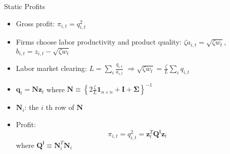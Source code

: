 \documentclass[
  10pt,               %
  aspectratio=169,     %
]{beamer}
\theoremstyle{plain}
\begin{document}
%
\begin{frame}{Static Profits}
  \begin{itemize}
    \item \label{Q} Gross profit: $\pi_{i,t}=q_{i,t}^2$
    \item Firms choose labor productivity and product quality: $\zeta a_{i,t}=\sqrt{\zeta w_{t}}$,
          $b_{i,t}=z_{i,t}-\sqrt{\zeta w_{t}}$
    \item Labor market clearing: $L=\sum_{i}\frac{q_{i,t}}{a_{i,t}}$ $\Longrightarrow$$\sqrt{\zeta w_{t}}=\frac{\zeta}{L}\sum_{i}q_{i,t}$
    \item $\bm{q}_{t}=\bm{N}\bm{z}_{t}$ where $\bm{N}\equiv\left\{ 2\frac{\zeta}{L}\bm{1}_{n\times n}+\bm{I}+\bm{\Sigma}\right\} ^{-1}$
    \item $\bm{N}_{i}$: the $i$ th row of $\bm{N}$
    \item Profit:
          {\small
          \[
            \pi_{i,t}=q_{i,t}^2=\bm{z}_{t}^{T}\bm{Q^i}\bm{z}_{t}
          \]}
          where $\bm{Q^i}\equiv\bm{N}_{i}^{T}\bm{N}_{i}$
  \end{itemize}
  \hyperlink{cournot}{}
\end{frame}
%
\end{document}
